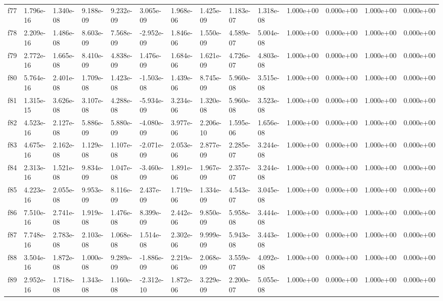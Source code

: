 \begin{table}
\begin{tabular}{llllllllllllll}
f77 & 1.796e-16 & 1.340e-08 & 9.188e-09 & 9.232e-09 & 3.065e-09 & 1.968e-06 & 1.425e-09 & 1.183e-07 & 1.318e-08 & 1.000e+00 & 0.000e+00 & 1.000e+00 & 0.000e+00 \\
f78 & 2.209e-16 & 1.486e-08 & 8.603e-09 & 7.568e-09 & -2.952e-09 & 1.846e-06 & 1.550e-09 & 4.589e-07 & 5.004e-08 & 1.000e+00 & 0.000e+00 & 1.000e+00 & 0.000e+00 \\
f79 & 2.772e-16 & 1.665e-08 & 8.410e-09 & 4.838e-09 & 1.476e-09 & 1.684e-06 & 1.621e-09 & 4.726e-07 & 4.803e-08 & 1.000e+00 & 0.000e+00 & 1.000e+00 & 0.000e+00 \\
f80 & 5.764e-16 & 2.401e-08 & 1.709e-08 & 1.423e-08 & -1.503e-08 & 1.439e-06 & 8.745e-09 & 5.960e-08 & 3.515e-08 & 1.000e+00 & 0.000e+00 & 1.000e+00 & 0.000e+00 \\
f81 & 1.315e-15 & 3.626e-08 & 3.107e-08 & 4.288e-08 & -5.934e-09 & 3.234e-06 & 1.320e-08 & 5.960e-08 & 3.523e-08 & 1.000e+00 & 0.000e+00 & 1.000e+00 & 0.000e+00 \\
f82 & 4.523e-16 & 2.127e-08 & 5.886e-09 & 5.880e-09 & -4.080e-09 & 3.977e-06 & 2.206e-10 & 1.595e-06 & 1.656e-08 & 1.000e+00 & 0.000e+00 & 1.000e+00 & 0.000e+00 \\
f83 & 4.675e-16 & 2.162e-08 & 1.129e-08 & 1.107e-08 & -2.071e-09 & 2.053e-06 & 2.877e-09 & 2.285e-07 & 3.244e-08 & 1.000e+00 & 0.000e+00 & 1.000e+00 & 0.000e+00 \\
f84 & 2.313e-16 & 1.521e-08 & 9.834e-09 & 1.047e-08 & -3.460e-09 & 1.891e-06 & 1.967e-09 & 2.357e-07 & 3.244e-08 & 1.000e+00 & 0.000e+00 & 1.000e+00 & 0.000e+00 \\
f85 & 4.223e-16 & 2.055e-08 & 9.953e-09 & 8.116e-09 & 2.437e-09 & 1.719e-06 & 1.334e-09 & 4.543e-07 & 3.045e-08 & 1.000e+00 & 0.000e+00 & 1.000e+00 & 0.000e+00 \\
f86 & 7.510e-16 & 2.741e-08 & 1.919e-08 & 1.476e-08 & 8.399e-09 & 2.442e-06 & 9.850e-09 & 5.958e-08 & 3.444e-08 & 1.000e+00 & 0.000e+00 & 1.000e+00 & 0.000e+00 \\
f87 & 7.748e-16 & 2.783e-08 & 2.103e-08 & 1.068e-08 & 1.514e-08 & 2.302e-06 & 9.999e-09 & 5.943e-08 & 3.443e-08 & 1.000e+00 & 0.000e+00 & 1.000e+00 & 0.000e+00 \\
f88 & 3.504e-16 & 1.872e-08 & 1.000e-08 & 9.289e-09 & -1.886e-09 & 2.219e-06 & 2.068e-09 & 3.559e-07 & 4.092e-08 & 1.000e+00 & 0.000e+00 & 1.000e+00 & 0.000e+00 \\
f89 & 2.952e-16 & 1.718e-08 & 1.343e-08 & 1.160e-08 & -2.312e-10 & 1.872e-06 & 3.229e-09 & 2.200e-07 & 5.055e-08 & 1.000e+00 & 0.000e+00 & 1.000e+00 & 0.000e+00 \\

\end{tabular}
\end{table}
